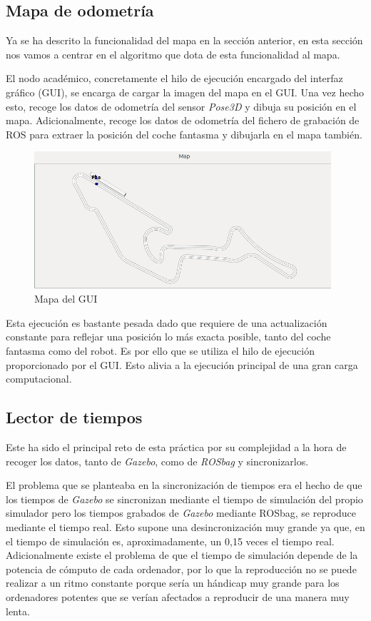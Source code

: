 \subsection{Mapa de odometría}
Ya se ha descrito la funcionalidad del mapa en la sección anterior, en esta sección nos vamos a centrar en el algoritmo que dota de esta funcionalidad al mapa.

El nodo académico, concretamente el hilo de ejecución encargado del interfaz gráfico (GUI), se encarga de cargar la imagen del mapa en el GUI. Una vez hecho esto, recoge los datos de odometría del sensor \textit{Pose3D} y dibuja su posición en el mapa. Adicionalmente, recoge los datos de odometría del fichero de grabación de ROS para extraer la posición del coche fantasma y dibujarla en el mapa también.

\begin{figure}[H]
  \begin{center}
    \includegraphics[width=0.98\textwidth]{figures/mapa_chrono.png}
		\caption{Mapa del GUI}
		\label{fig.mapach}
		\end{center}
\end{figure}

Esta ejecución es bastante pesada dado que requiere de una actualización constante para reflejar una posición lo más exacta posible, tanto del coche fantasma como del robot. Es por ello que se utiliza el hilo de ejecución proporcionado por el GUI. Esto alivia a la ejecución principal de una gran carga computacional.

\subsection{Lector de tiempos}
Este ha sido el principal reto de esta práctica por su complejidad a la hora de recoger los datos, tanto de \textit{Gazebo}, como de \textit{ROSbag} y sincronizarlos.

El problema que se planteaba en la sincronización de tiempos era el hecho de que los tiempos de \textit{Gazebo} se sincronizan mediante el tiempo de simulación del propio simulador pero los tiempos grabados de \textit{Gazebo} mediante ROSbag, se reproduce mediante el tiempo real. Esto supone una desincronización muy grande ya que, en el tiempo de simulación es, aproximadamente, un 0,15 veces el tiempo real. Adicionalmente existe el problema de que el tiempo de simulación depende de la potencia de cómputo de cada ordenador, por lo que la reproducción no se puede realizar a  un ritmo constante porque sería un hándicap muy grande para los ordenadores potentes que se verían afectados a reproducir de una manera muy lenta.

